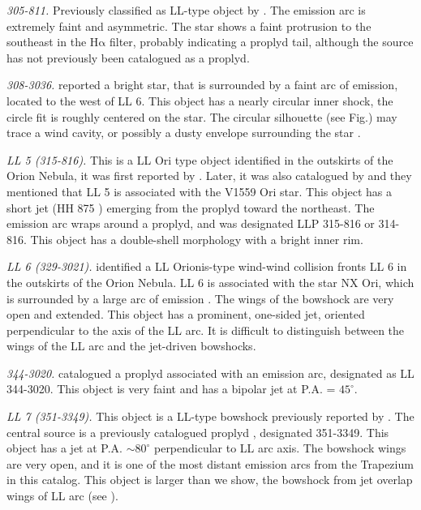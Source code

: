 \documentclass[apj, twocolumn]{aastex63}
\newcommand\ha{\ensuremath{\mathrm{H\alpha}}}
\begin{document}
\textit{305-811.} Previously classified as LL-type object
by \citet{Bally:2006a}. The emission arc is extremely faint
and asymmetric. The star shows  a faint protrusion to the
southeast in the \ha{} filter, probably indicating a proplyd
tail, although the source has not previously been catalogued as
a proplyd.    

\textit{308-3036.} \citet{Bally:2006a} reported a bright star,
that is surrounded by a faint arc of emission, located to the west
of LL 6. This object has a nearly circular inner shock, the circle
fit is roughly centered on the star. The circular silhouette
(see Fig.) may trace a wind cavity, or possibly a dusty envelope
surrounding the star \citep{Bally:2006a}.       

\textit{LL 5 (315-816).} This is a LL Ori type object identified in
the outskirts of the Orion Nebula, it was first reported by
\citet{Bally:2001a}. Later, it was also catalogued by
\citet{Bally:2006a} and they mentioned that LL 5 is associated
with the  V1559 Ori star. This object has a short jet (HH 875
\citealp{Bally:2006a}) emerging from the proplyd toward the northeast.
The emission arc wraps around a proplyd, and was designated LLP 315-816
or 314-816. This object has a double-shell morphology with a bright
inner rim.
       
\textit{LL 6 (329-3021).} \citep{Bally:2001a} identified a LL Orionis-type
wind-wind collision fronts LL 6 in the outskirts of the Orion Nebula. LL 6
is associated with the star NX Ori, which is surrounded by a large arc of
emission \citep{Bally:2006a}. The wings of the bowshock are very open and
extended. This object has a prominent, one-sided jet, oriented perpendicular
to the axis of the LL arc. It is difficult to distinguish between the wings
of the LL arc and the jet-driven bowshocks.    

\textit{344-3020.} \citet{Bally:2006a} catalogued a proplyd associated
with an emission arc, designated as LL 344-3020. This object is very faint
and has a bipolar jet at P.A. = $45^{\circ}$.     

\textit{LL 7 (351-3349).} This object is a LL-type bowshock previously
reported by \citet{Bally:2001a}. The central source is a previously
catalogued proplyd \citep{Ricci:2008a}, designated 351-3349. This object
has a jet at P.A. $\sim 80^{\circ}$ perpendicular to LL arc axis. The
bowshock wings are very open, and it is one of the most distant emission
arcs from the Trapezium in this catalog. This object is larger than we show,
the bowshock from jet overlap wings of LL arc (see \citealp{Bally:2001a}).   
\end{document}
